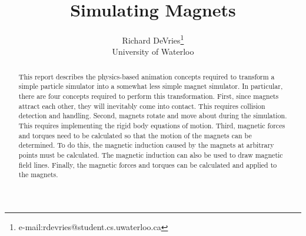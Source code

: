 \documentclass[tog]{acmsiggraph}
\title{Simulating Magnets}
\author{Richard DeVries\thanks{e-mail:rdevries@student.cs.uwaterloo.ca}\\University of Waterloo}
\begin{document}



\maketitle


\begin{abstract}

This report describes the physics-based animation concepts required to transform a simple particle simulator into a somewhat less simple magnet simulator. In particular, there are four concepts required to perform this transformation. First, since magnets attract each other, they will inevitably come into contact. This requires collision detection and handling. Second, magnets rotate and move about during the simulation. This requires implementing the rigid body equations of motion. Third, magnetic forces and torques need to be calculated so that the motion of the magnets can be determined. To do this, the magnetic induction caused by the magnets at arbitrary points must be calculated. The magnetic induction can also be used to draw magnetic field lines. Finally, the magnetic forces and torques can be calculated and applied to the magnets.


\end{abstract}
\end{document}
